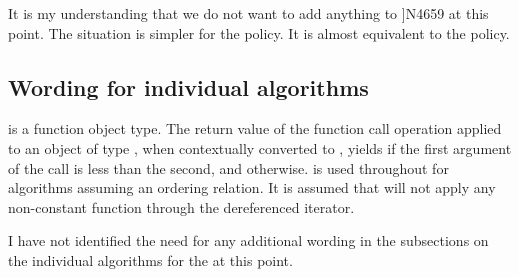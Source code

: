 \newcommand\tmp{[algorithms.parallel.exceptions]}
It is my understanding that we do not want to add anything to \citep[§28.4.4 \tmp{}]{N4659} at this point.
The situation is simpler for the \simdEP policy.
It is almost equivalent to the  policy.

\subsection{Wording for individual algorithms}
\begin{wgText}
  \setcounter{Paras}{1}%
    \pnum
     is a function object type.
    The return value of the function call operation applied to an object of type , when contextually converted to \bool, yields \true if the first argument of the call is less than the second, and \false otherwise.
     is used throughout for algorithms assuming an ordering relation.
    It is assumed that  will not apply any non-constant function through the dereferenced iterator.

\end{wgText}
I have not identified the need for any additional wording in the subsections on the individual algorithms for the \simdEPT at this point.

